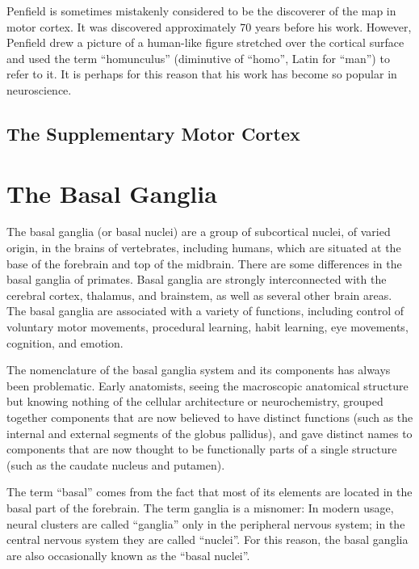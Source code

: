 Penfield is sometimes mistakenly considered to be the discoverer of the map in motor cortex. It was discovered approximately 70 years before his work. However, Penfield drew a picture of a human-like figure stretched over the cortical surface and used the term ``homunculus'' (diminutive of ``homo'', Latin for ``man'') to refer to it. It is perhaps for this reason that his work has become so popular in neuroscience.

\hypertarget{the-supplementary-motor-cortex}{%
\subsection{The Supplementary Motor Cortex}\label{the-supplementary-motor-cortex}}

\hypertarget{the-basal-ganglia-1}{%
\section{The Basal Ganglia}\label{the-basal-ganglia-1}}

The basal ganglia (or basal nuclei) are a group of subcortical nuclei, of varied origin, in the brains of vertebrates, including humans, which are situated at the base of the forebrain and top of the midbrain. There are some differences in the basal ganglia of primates. Basal ganglia are strongly interconnected with the cerebral cortex, thalamus, and brainstem, as well as several other brain areas. The basal ganglia are associated with a variety of functions, including control of voluntary motor movements, procedural learning, habit learning, eye movements, cognition, and emotion.

The nomenclature of the basal ganglia system and its components has always been problematic. Early anatomists, seeing the macroscopic anatomical structure but knowing nothing of the cellular architecture or neurochemistry, grouped together components that are now believed to have distinct functions (such as the internal and external segments of the globus pallidus), and gave distinct names to components that are now thought to be functionally parts of a single structure (such as the caudate nucleus and putamen).

The term ``basal'' comes from the fact that most of its elements are located in the basal part of the forebrain. The term ganglia is a misnomer: In modern usage, neural clusters are called ``ganglia'' only in the peripheral nervous system; in the central nervous system they are called ``nuclei''. For this reason, the basal ganglia are also occasionally known as the ``basal nuclei''.

